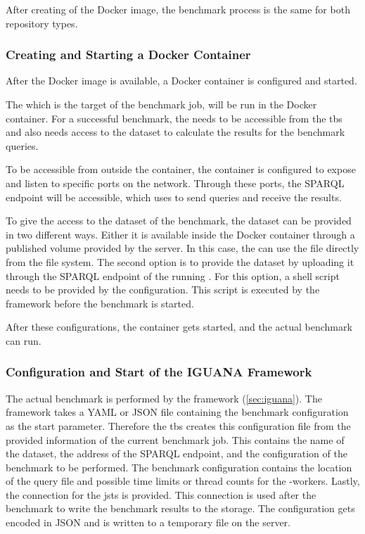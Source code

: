 After creating of the Docker image, the benchmark process is the same for both repository types.


\subsubsection{Creating and Starting a Docker Container}
After the Docker image is available, a Docker container is configured and started.

The \ts{} which is the target of the benchmark job, will be run in the Docker container.
For a successful benchmark, the \ts{} needs to be accessible from the \ac{tbs} and also needs access to the dataset to calculate the results for the benchmark queries.

To be accessible from outside the container, the container is configured to expose and listen to specific ports on the network.
Through these ports, the SPARQL endpoint will be accessible, which \iguana{} uses to send queries and receive the results.

To give the \ts{} access to the dataset of the benchmark, the dataset can be provided in two different ways.
Either it is available inside the Docker container through a published volume provided by the server.
In this case, the \ts{} can use the file directly from the file system.
The second option is to provide the dataset by uploading it through the SPARQL endpoint of the running \ts{}.
For this option, a shell script needs to be provided by the \ts{} configuration.
This script is executed by the \iguana{} framework before the benchmark is started.

After these configurations, the container gets started, and the actual benchmark can run.


\subsubsection{Configuration and Start of the IGUANA Framework}
The actual benchmark is performed by the \iguana{} framework (\ref{sec:iguana}).
The framework takes a YAML or JSON file containing the benchmark configuration as the start parameter.
Therefore the \ac{tbs} creates this configuration file from the provided information of the current benchmark job.
This contains the name of the dataset, the address of the SPARQL endpoint, and the configuration of the benchmark to be performed.
The benchmark configuration contains the location of the query file and possible time limits or thread counts for the \iguana{}-workers.
Lastly, the connection for the \ac{jsts} is provided.
This connection is used after the benchmark to write the benchmark results to the storage.
The \iguana{} configuration gets encoded in JSON and is written to a temporary file on the server.
\\

